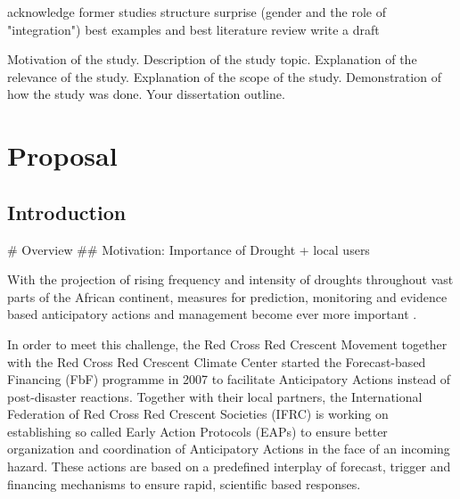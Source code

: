 acknowledge former studies
structure 
surprise (gender and the role of "integration")
best examples and best literature review
write a draft

Motivation of the study.
Description of the study topic.
Explanation of the relevance of the study.
Explanation of the scope of the study.
Demonstration of how the study was done.
Your dissertation outline.




\chapter{Proposal} %

\label{Proposal} %

\newcommand{\keyword}[1]{\textbf{\#1}}
\newcommand{\tabhead}[1]{\textbf{\#1}}
\newcommand{\code}[1]{\texttt{\#1}}
\newcommand{\file}[1]{\texttt{\bfseries\#1}}
\newcommand{\option}[1]{\texttt{\itshape\#1}}


\section{Introduction}
\# Overview
\#\# Motivation: Importance of Drought + local users

With the projection of rising frequency and intensity of droughts throughout vast parts of the African continent, measures for prediction, monitoring and evidence based anticipatory actions and management become ever more important \autocite{abdulkadirAssessmentDroughtRecurrence2017,adelekanAfricaClimateChange2022,vereintenationenSpecialReportDrought2021}.

In order to meet this challenge, the Red Cross Red Crescent Movement together with the Red Cross Red Crescent Climate Center started the Forecast-based Financing (FbF) programme in 2007 to facilitate Anticipatory Actions instead of post-disaster reactions. Together with their local partners, the International Federation of Red Cross Red Crescent Societies (IFRC) is working on establishing so called Early Action Protocols (EAPs) to ensure better organization and coordination of Anticipatory Actions in the face of an incoming hazard. These actions are based on a predefined interplay of forecast, trigger and financing mechanisms to ensure rapid, scientific based responses.


